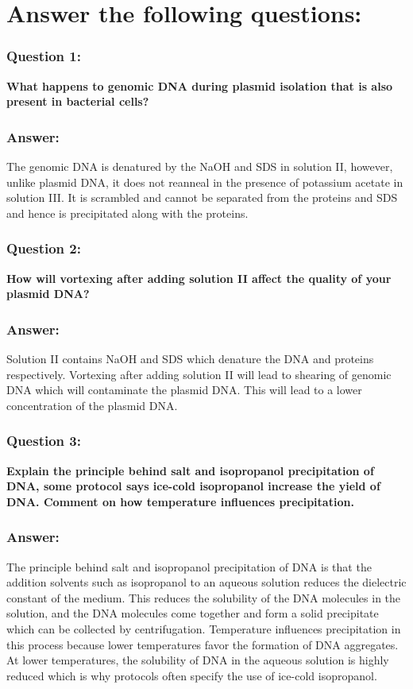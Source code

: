 \documentclass{report}
\begin{document}
\section*{Answer the following questions:}

\subsubsection*{Question 1:}
\textbf{What happens to genomic DNA during plasmid isolation that is also present in bacterial cells?}

\subsubsection*{Answer:}
The genomic DNA is denatured by the NaOH and SDS in solution II, however, unlike plasmid DNA, it does not reanneal in the presence of potassium acetate in solution III.
It is scrambled and cannot be separated from the proteins and SDS and hence is precipitated along with the proteins.

\subsubsection*{Question 2:}
\textbf{How will vortexing after adding solution II affect the quality of your plasmid DNA?}

\subsubsection*{Answer:}
Solution II contains NaOH and SDS which denature the DNA and proteins respectively.
Vortexing after adding solution II will lead to shearing of genomic DNA which will contaminate the plasmid DNA.
This will lead to a lower concentration of the plasmid DNA.

\subsubsection*{Question 3:}
\textbf{Explain the principle behind salt and isopropanol precipitation of DNA, some protocol says ice-cold isopropanol increase the yield of DNA. Comment on how temperature influences precipitation.}

\subsubsection*{Answer:}
The principle behind salt and isopropanol precipitation of DNA is that
the addition solvents such as isopropanol to an aqueous solution
reduces the dielectric constant of the medium. This reduces the solubility of the DNA molecules in
the solution, and the DNA molecules come together and form a solid precipitate which can be collected by centrifugation. Temperature influences precipitation in this process because
lower temperatures favor the formation of DNA aggregates. At lower temperatures, the solubility
of DNA in the aqueous solution is highly reduced which is
why protocols often specify the use of ice-cold isopropanol.



 
\end{document}
